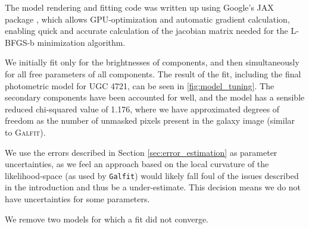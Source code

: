 \documentclass[main\.tex]{subfiles}
\begin{document}
The model rendering and fitting code was written up using Google's JAX package \citep{jax2018github}, which allows GPU-optimization and automatic gradient calculation, enabling quick and accurate calculation of the jacobian matrix needed for the L-BFGS-b minimization algorithm.

We initially fit only for the brightnesses of components, and then simultaneously for all free parameters of all components. The result of the fit, including the final photometric model for UGC 4721, can be seen in \ref{fig:model_tuning}. The secondary components have been accounted for well, and the model has a sensible reduced chi-squared value of 1.176, where we have approximated degrees of freedom as the number of unmasked pixels present in the galaxy image (similar to \textsc{Galfit}).

\begin{figure*}
  \caption{Effect of fitting on the aggregated models. The top left panel shows an Arcsinh-scaled image of the galaxy being fit (UGC 4721), the top middle shows the final model obtained (with the same limits and scaling as the galaxy image) and the top right shows the difference between the two images, in units of pixel uncertainty. The bottom panels show a simple representation of the model before and after tuning, overlaid on the galaxy image from the top-left panel. With minimal change to the aggregated components, we recover a detailed model that matches the galaxy exceptionally well, as evident in the residuals.}
  \label{fig:model_tuning}
\end{figure*}

We use the errors described in Section \ref{sec:error_estimation} as parameter uncertainties, as we feel an approach based on the local curvature of the likelihood-space (as used by \texttt{Galfit}) would likely fall foul of the issues described in the introduction and thus be a under-estimate. This decision means we do not have uncertainties for some parameters.

We remove two models for which a fit did not converge.
\end{document}
